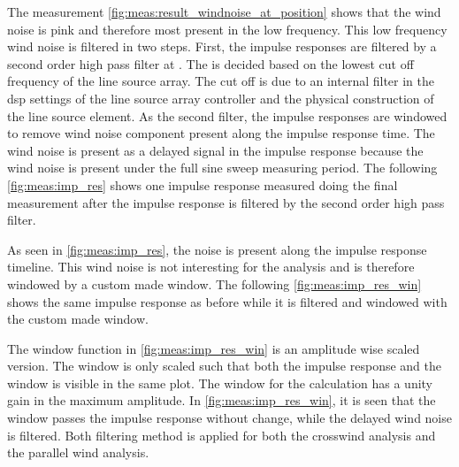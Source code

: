 The measurement \autoref{fig:meas:result_windnoise_at_position} shows that the wind noise is pink and therefore most present in the low frequency. This low frequency wind noise is filtered in two steps. First, the impulse responses are filtered by a second order high pass filter at .  The  is decided based on the lowest cut off frequency of the line source array. The cut off is due to an internal filter in the \gls{dsp} settings of the line source array controller and the physical construction of the line source element. As the second filter, the impulse responses are windowed to remove wind noise component present along the impulse response time. The wind noise is present as a delayed signal in the impulse response because the wind noise is present under the full sine sweep measuring period. The following \autoref{fig:meas:imp_res} shows one impulse response measured doing the final measurement after the impulse response is filtered by the second order high pass filter.



As seen in \autoref{fig:meas:imp_res}, the noise is present along the impulse response timeline. This wind noise is not interesting for the analysis and is therefore windowed by a custom made window. The following \autoref{fig:meas:imp_res_win} shows the same impulse response as before while it is filtered and windowed with the custom made window.



The window function in \autoref{fig:meas:imp_res_win} is an amplitude wise scaled version. The window is only scaled such that both the impulse response and the window is visible in the same plot. The window for the calculation has a unity gain in the maximum amplitude. In \autoref{fig:meas:imp_res_win}, it is seen that the window passes the impulse response without change, while the delayed wind noise is filtered. Both filtering method is applied for both the crosswind analysis and the parallel wind analysis. 

